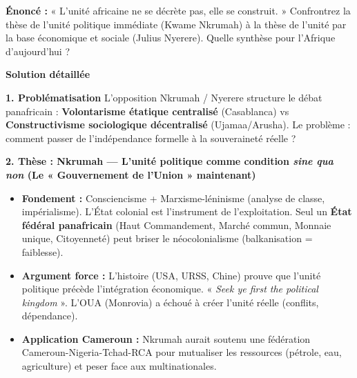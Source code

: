 \documentclass[11pt]{article}
\begin{document}
\begin{exoresolu}
\textbf{Énoncé :} « L'unité africaine ne se décrète pas, elle se construit. » Confrontrez la thèse de l'unité politique immédiate (Kwame Nkrumah) à la thèse de l'unité par la base économique et sociale (Julius Nyerere). Quelle synthèse pour l'Afrique d'aujourd'hui ?

\tcblower
\textbf{Solution détaillée}

\textbf{1. Problématisation}
L'opposition Nkrumah / Nyerere structure le débat panafricain : \textbf{Volontarisme étatique centralisé} (Casablanca) vs \textbf{Constructivisme sociologique décentralisé} (Ujamaa/Arusha). Le problème : comment passer de l'indépendance formelle à la souveraineté réelle ?

\textbf{2. Thèse : Nkrumah — L'unité politique comme condition \emph{sine qua non} (Le « Gouvernement de l'Union » maintenant)}
\begin{itemize}
    \item \textbf{Fondement :} Consciencisme + Marxisme-léninisme (analyse de classe, impérialisme). L'État colonial est l'instrument de l'exploitation. Seul un \textbf{État fédéral panafricain} (Haut Commandement, Marché commun, Monnaie unique, Citoyenneté) peut briser le néocolonialisme (balkanisation = faiblesse).
    \item \textbf{Argument force :} L'histoire (USA, URSS, Chine) prouve que l'unité politique précède l'intégration économique. « \emph{Seek ye first the political kingdom} ». L'OUA (Monrovia) a échoué à créer l'unité réelle (conflits, dépendance).
    \item \textbf{Application Cameroun :} Nkrumah aurait soutenu une fédération Cameroun-Nigeria-Tchad-RCA pour mutualiser les ressources (pétrole, eau, agriculture) et peser face aux multinationales.
\end{itemize}


\end{exoresolu}
\end{document}
